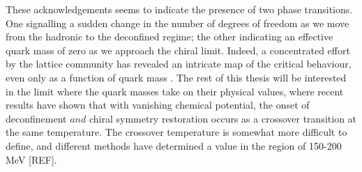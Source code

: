 \documentclass[11pt, a4paper, twoside]{book}
\begin{document}
These acknowledgements seems to indicate the presence of two phase transitions. One signalling a sudden change in the number of degrees of freedom as we move from the hadronic to the deconfined regime; the other indicating an effective quark mass of zero as we approach the chiral limit. Indeed, a concentrated effort by the lattice community has revealed an intricate map of the critical behaviour, even only as a function of quark mass \cite{Satz:2018oiz}. The rest of this thesis will be interested in the limit where the quark masses take on their physical values, where recent results have shown that with vanishing chemical potential, the onset of deconfinement \(and\) chiral symmetry restoration occurs as a crossover transition at the same temperature. The crossover temperature is somewhat more difficult to define, and different methods have determined a value in the region of 150-200 MeV [REF].
\end{document}

